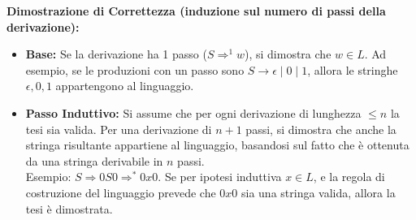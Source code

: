 \vspace{0.1 cm}
\textbf{Dimostrazione di Correttezza (induzione sul numero di passi della derivazione):}
\begin{itemize}
    \item \textbf{Base:} Se la derivazione ha 1 passo ($S \Rightarrow^1 w$), si dimostra che $w \in L$. Ad esempio, se le produzioni con un passo sono $S \rightarrow \epsilon \mid 0 \mid 1$, allora le stringhe $\epsilon, 0, 1$ appartengono al linguaggio.
    
    \item \textbf{Passo Induttivo:} Si assume che per ogni derivazione di lunghezza $\le n$ la tesi sia valida. Per una derivazione di $n+1$ passi, si dimostra che anche la stringa risultante appartiene al linguaggio, basandosi sul fatto che è ottenuta da una stringa derivabile in $n$ passi. \\
    Esempio: $S \Rightarrow 0S0 \Rightarrow^* 0x0$. Se per ipotesi induttiva $x \in L$, e la regola di costruzione del linguaggio prevede che $0x0$ sia una stringa valida, allora la tesi è dimostrata.
\end{itemize}